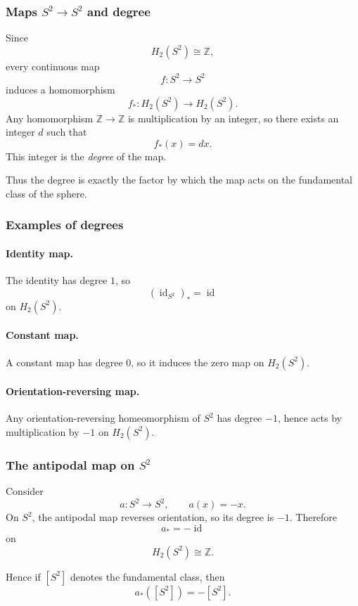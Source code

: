 \documentclass[12pt,a4paper]{article}
\theoremstyle{notespace}
\begin{document}
\subsubsection{Maps \texorpdfstring{$S^2\to S^2$}{S2 to S2} and degree}

Since
\[
H_2(S^2)\cong \mathbb{Z},
\]
every continuous map
\[
f:S^2\to S^2
\]
induces a homomorphism
\[
f_*:H_2(S^2)\to H_2(S^2).
\]
Any homomorphism \(\mathbb{Z}\to\mathbb{Z}\) is multiplication by an integer, so there exists an integer \(d\) such that
\[
f_*(x)=dx.
\]
This integer is the \emph{degree} of the map.

Thus the degree is exactly the factor by which the map acts on the fundamental class of the sphere.

\subsubsection{Examples of degrees}

\paragraph{Identity map.}
The identity has degree \(1\), so
\[
(\operatorname{id}_{S^2})_*=\operatorname{id}
\]
on \(H_2(S^2)\).

\paragraph{Constant map.}
A constant map has degree \(0\), so it induces the zero map on \(H_2(S^2)\).

\paragraph{Orientation-reversing map.}
Any orientation-reversing homeomorphism of \(S^2\) has degree \(-1\), hence acts by multiplication by \(-1\) on \(H_2(S^2)\).

\subsubsection{The antipodal map on \texorpdfstring{$S^2$}{S2}}

Consider
\[
a:S^2\to S^2,\qquad a(x)=-x.
\]
On \(S^2\), the antipodal map reverses orientation, so its degree is \(-1\). Therefore
\[
a_*=-\operatorname{id}
\]
on
\[
H_2(S^2)\cong \mathbb{Z}.
\]

Hence if \([S^2]\) denotes the fundamental class, then
\[
a_*([S^2])=-[S^2].
\]
\end{document}
